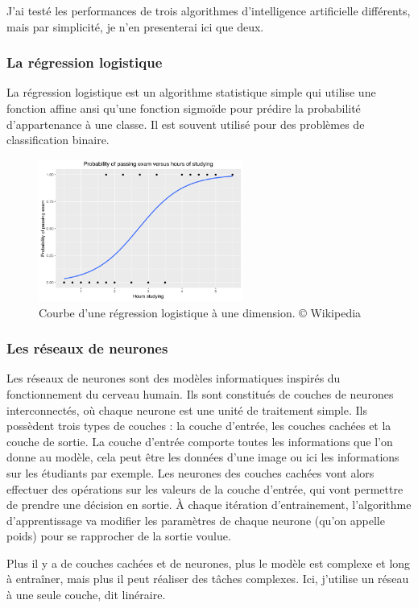 \documentclass[12pt, letterpaper]{article}
\begin{document}
J'ai testé les performances de trois algorithmes d'intelligence artificielle différents, mais par simplicité, je n'en presenterai ici que deux.

\subsubsection*{La régression logistique}
La régression logistique est un algorithme statistique simple qui utilise une fonction affine ansi qu'une fonction sigmoïde pour prédire la probabilité d'appartenance à une classe. Il est souvent utilisé pour des problèmes de classification binaire.

\begin{figure}[h]
    \centering
    \includegraphics[width=0.6\textwidth]{logistic}
    \caption{Courbe d'une régression logistique à une dimension. © Wikipedia}
\end{figure}

\subsubsection*{Les réseaux de neurones}
Les réseaux de neurones sont des modèles informatiques inspirés du fonctionnement du
cerveau humain. Ils sont constitués de couches de neurones interconnectés, où chaque
neurone est une unité de traitement simple. Ils possèdent trois types de couches : la couche
d'entrée, les couches cachées et la couche de sortie.
La couche d'entrée comporte toutes les informations que l'on donne au modèle, cela peut être les données 
d'une image ou ici les informations sur les étudiants par exemple. Les neurones des couches cachées vont alors effectuer des 
opérations sur les valeurs de la couche d'entrée, qui vont permettre de prendre une décision en sortie. À chaque itération 
d'entrainement, l'algorithme d'apprentissage va modifier les 
paramètres de chaque neurone (qu'on appelle poids) pour se rapprocher de la sortie voulue. 

Plus il y a de couches cachées et de neurones, plus le modèle est complexe et long à
entraîner, mais plus il peut réaliser des tâches complexes. Ici, j'utilise un réseau à une seule couche, dit linéraire.
\end{document}
